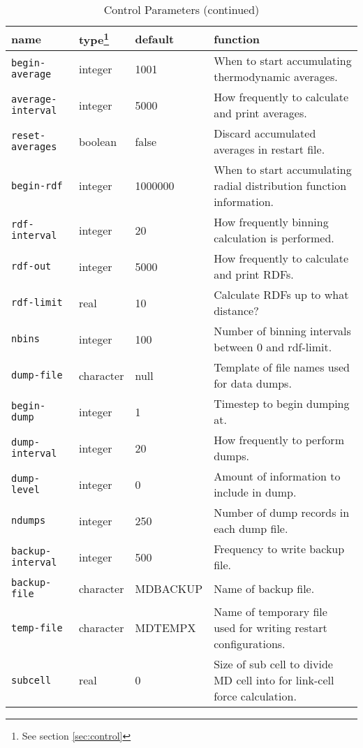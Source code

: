 \begin{table}
\begin{minipage}{\textwidth}
\caption{Control Parameters (continued)}
\begin{tabular}{|l|l|l|p{2.7in}|}
\hline
{\bf name} & {\bf type}\footnote{See section \ref{sec:control}} &
{\bf default} & {\bf function} \\ \hline \hline
\verb'begin-average' &   	integer & 		1001 &
When to start accumulating thermodynamic averages. \\
\verb'average-interval' &	integer & 		5000 &
How frequently to calculate and print averages. \\
\verb'reset-averages' &  	boolean & 		false  &
Discard accumulated averages in restart file. \\ \hline
\verb'begin-rdf' &		integer & 		1000000 &
When to start accumulating radial distribution function information. \\
\verb'rdf-interval' &		integer & 		20 &
How frequently binning calculation is performed. \\
\verb'rdf-out' &		integer & 		5000 &
How frequently to calculate and print RDFs. \\
\verb'rdf-limit' &		real &			10 &
Calculate RDFs up to what distance? \\
\verb'nbins' &			integer & 		100 &
Number of binning intervals between 0 and rdf-limit. \\ \hline
\verb'dump-file' &	    	character  &	null &
Template of file names used for data dumps. \\
\verb'begin-dump' &		integer & 		1 &
Timestep to begin dumping at. \\
\verb'dump-interval' &  	integer & 		20 &
How frequently to perform dumps. \\
\verb'dump-level' &		integer & 		0 &
Amount of information to include in dump. \\
\verb'ndumps' &		integer & 		250 &
Number of dump records in each dump file. \\ \hline
\verb'backup-interval' &	integer & 		500 &
Frequency to write backup file. \\
\verb'backup-file' &		character  &	MDBACKUP &
Name of backup file. \\ \hline
\verb'temp-file' &		character  &	MDTEMPX &
Name of temporary file used for writing restart configurations. \\ \hline
\verb'subcell' &		real &			0 &
Size of sub cell to divide MD cell into for link-cell force
calculation. \\ \hline

\end{tabular}
\end{minipage}
\end{table}

